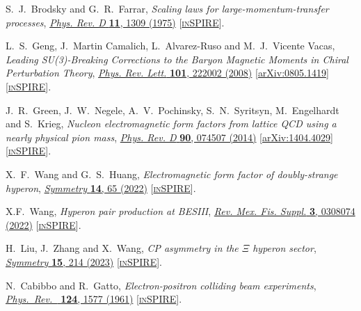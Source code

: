 \documentclass[a4paper,11pt]{article}
\begin{document}
\begin{thebibliography}{**}
S.~J.~Brodsky and G.~R.~Farrar,
\textit{Scaling laws for large-momentum-transfer processes},
\href{https://journals.aps.org/prd/abstract/10.1103/PhysRevD.11.1309}{\textit{Phys. Rev. D} \textbf{11}, 1309 (1975)}
[\textcolor{blue}{\href{https://inspirehep.net/literature/91718}{\textsc{inSPIRE}}}].

L.~S.~Geng, J.~Martin Camalich, L.~Alvarez-Ruso and M.~J.~Vicente Vacas,
\textit{Leading SU(3)-Breaking Corrections to the Baryon Magnetic Moments in Chiral Perturbation Theory},
\href{https://journals.aps.org/prl/abstract/10.1103/PhysRevLett.101.222002}{\textit{Phys. Rev. Lett.} \textbf{101}, 222002 (2008)}
[\textcolor{blue}{\href{https://arxiv.org/pdf/0805.1419.pdf}{arXiv:0805.1419}}] 
[\textcolor{blue}{\href{https://inspirehep.net/literature/785474}{\textsc{inSPIRE}}}].

J.~R.~Green, J.~W.~Negele, A.~V.~Pochinsky, S.~N.~Syritsyn, M.~Engelhardt and S.~Krieg,
\textit{Nucleon electromagnetic form factors from lattice QCD using a nearly physical pion mass},
\href{https://journals.aps.org/prd/abstract/10.1103/PhysRevD.90.074507}{\textit{Phys. Rev. D} \textbf{90}, 074507 (2014)}
[\textcolor{blue}{\href{https://arxiv.org/pdf/1404.4029.pdf}{arXiv:1404.4029}}] 
[\textcolor{blue}{\href{https://inspirehep.net/literature/1290533}{\textsc{inSPIRE}}}].

X.~F.~Wang and G.~S.~Huang,
\textit{Electromagnetic form factor of doubly-strange hyperon},
\href{https://doi.org/10.3390/sym14010065}{\textit{Symmetry} \textbf{14}, 65 (2022)}
[\textcolor{blue}{\href{https://inspirehep.net/literature/2037456}{\textsc{inSPIRE}}}].

X.F.~Wang,
\textit{Hyperon pair production at BESIII},
\href{https://rmf.smf.mx/ojs/index.php/rmf-s/article/view/5984/6364}{\textit{Rev. Mex. Fis. Suppl.} \textbf{3}, 0308074 (2022)}
[\textcolor{blue}{\href{https://inspirehep.net/literature/2090070}{\textsc{inSPIRE}}}].

H.~Liu, J.~Zhang and X.~Wang,
\textit{CP asymmetry in the $\Xi$ hyperon sector},
\href{https://www.mdpi.com/2073-8994/15/1/214}{
\textit{Symmetry} \textbf{15}, 214 (2023)}
[\textcolor{blue}{\href{https://inspirehep.net/literature/2633221}{\textsc{inSPIRE}}}].

 N.~Cabibbo and R.~Gatto, 
\textit{Electron-positron colliding beam experiments}, 
\href{https://journals.aps.org/pr/abstract/10.1103/PhysRev.124.1577}{\textit{Phys.\ Rev.\ } {\bf 124}, 1577 (1961)}
[\textcolor{blue}{\href{https://inspirehep.net/literature/25387}{\textsc{inSPIRE}}}].


\end{thebibliography}
\end{document}
